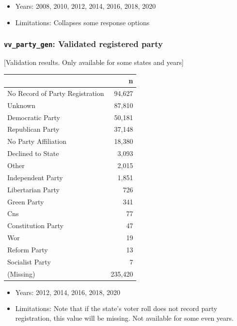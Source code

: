 \documentclass[10pt,article,oneside]{memoir}
\theoremstyle{definition}
\begin{document}
\begin{itemize}
\tightlist
\item
  Years: 2008, 2010, 2012, 2014, 2016, 2018, 2020
\item
  Limitations: Collapses some response options
\end{itemize}

\hypertarget{vv_party_gen-validated-registered-party}{%
\subsubsection{\texorpdfstring{\texttt{vv\_party\_gen}: Validated
registered
party}{vv\_party\_gen: Validated registered party}}\label{vv_party_gen-validated-registered-party}}

{[}Validation results. Only available for some states and years{]}

\begin{table}[H]
\centering
\begin{tabular}[t]{lr}
\toprule
 & n\\
\midrule
No Record of Party Registration & 94,627\\
Unknown & 87,810\\
Democratic Party & 50,181\\
Republican Party & 37,148\\
No Party Affiliation & 18,380\\
Declined to State & 3,093\\
Other & 2,015\\
Independent Party & 1,851\\
Libertarian Party & 726\\
Green Party & 341\\
Cns & 77\\
Constitution Party & 47\\
Wor & 19\\
Reform Party & 13\\
Socialist Party & 7\\
(Missing) & 235,420\\
\bottomrule
\end{tabular}
\end{table}

\begin{itemize}
\tightlist
\item
  Years: 2012, 2014, 2016, 2018, 2020
\item
  Limitations: Note that if the state's voter roll does not record party
  registration, this value will be missing. Not available for some even
  years.
\end{itemize}
\end{document}
